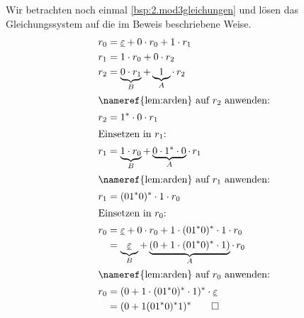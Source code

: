 \begin{Bsp}
Wir betrachten noch einmal \autoref{bsp:2.mod3gleichungen} und lösen das Gleichungssystem auf die im Beweis beschriebene Weise.
	\begin{align*}
		r_0 &= \1 + 0\cdot r_0 + 1\cdot r_1\\
		r_1 &= 1\cdot r_0 + 0\cdot r_2\\
		r_2 &= \underbrace{0\cdot r_1}_B + \underbrace{1}_A \mathop{\cdot} r_2\\
		\shortintertext{\nameref{lem:arden} auf $r_2$ anwenden:}
		r_2 &= 1^*\cdot 0\cdot r_1\\
		\shortintertext{Einsetzen in $r_1$:}
		r_1 &= \underbrace{1\cdot r_0}_B+\underbrace{0\cdot 1^*\cdot 0}_A \mathop{\cdot} r_1\\
		\shortintertext{\nameref{lem:arden} auf $r_1$ anwenden:}
		r_1 &= (01^*0)^*\cdot 1\cdot r_0\\
		\shortintertext{Einsetzen in $r_0$:}
		r_0 &= \1 + 0\cdot r_0+1\cdot (01^*0)^*\cdot 1\cdot r_0\\
		&= \underbrace{\1}_B+\underbrace{(0+1\cdot (01^*0)^*\cdot 1)}_A \mathop{\cdot} r_0\\
		\shortintertext{\nameref{lem:arden} auf $r_0$ anwenden:}
		r_0 &= (0+1\cdot (01^*0)^*\cdot 1)^*\cdot \1 \\
		&= (0+1(01^*0)^*1)^*
		\qedhere
	\end{align*}
\end{Bsp}
%

